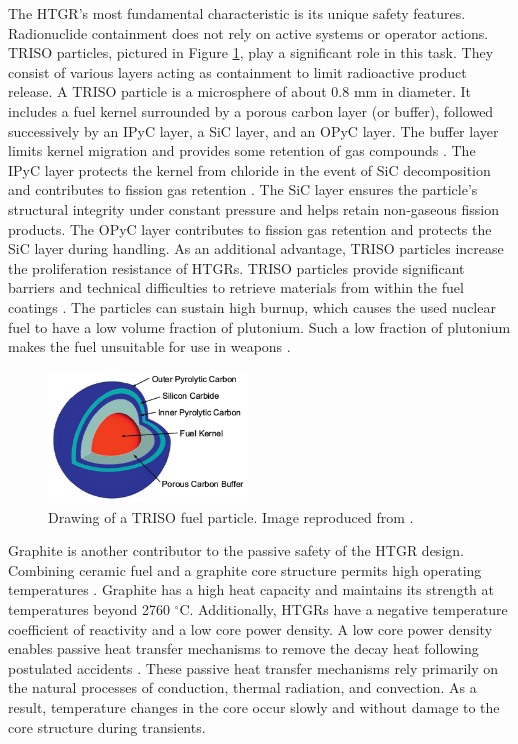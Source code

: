 The HTGR's most fundamental characteristic is its unique safety features.
Radionuclide containment does not rely on active systems or operator actions.
\gls{TRISO} particles, pictured in Figure \ref{fig:triso}, play a significant role in this task.
They consist of various layers acting as containment to limit radioactive product release.
A \gls{TRISO} particle is a microsphere of about 0.8 mm in diameter.
It includes a fuel kernel surrounded by a porous carbon layer (or buffer), followed successively by an \gls{IPyC} layer, a \gls{SiC} layer, and an \gls{OPyC} layer.
The buffer layer limits kernel migration and provides some retention of gas compounds \cite{oecd_nea_benchmark_2017}.
The \gls{IPyC} layer protects the kernel from chloride in the event of \gls{SiC} decomposition and contributes to fission gas retention \cite{demkowickz_paul_triso_2019}.
The \gls{SiC} layer ensures the particle's structural integrity under constant pressure and helps retain non-gaseous fission products.
The \gls{OPyC} layer contributes to fission gas retention and protects the \gls{SiC} layer during handling.
As an additional advantage, \gls{TRISO} particles increase the proliferation resistance of \glspl{HTGR}.
TRISO particles provide significant barriers and technical difficulties to retrieve materials from within the fuel coatings \cite{paviet-hartmann_analysis_2011}.
The particles can sustain high burnup, which causes the used nuclear fuel to have a low volume fraction of plutonium.
Such a low fraction of plutonium makes the fuel unsuitable for use in weapons \cite{paviet-hartmann_analysis_2011}.

\begin{figure}[htbp!]
	\centering
	\includegraphics[height=3.5cm]{figures/triso}
	\caption{Drawing of a TRISO fuel particle. Image reproduced from \cite{hales_multidimensional_2013}.}
	\label{fig:triso}
\end{figure}

Graphite is another contributor to the passive safety of the \gls{HTGR} design.
Combining ceramic fuel and a graphite core structure permits high operating temperatures \cite{ballinger_balance_2004}.
Graphite has a high heat capacity and maintains its strength at temperatures beyond 2760 $^{\circ}$C.
Additionally, HTGRs have a negative temperature coefficient of reactivity and a low core power density.
A low core power density enables passive heat transfer mechanisms to remove the decay heat following postulated accidents \cite{neylan_modular_1988}.
These passive heat transfer mechanisms rely primarily on the natural processes of conduction, thermal radiation, and convection.
As a result, temperature changes in the core occur slowly and without damage to the core structure during transients.


